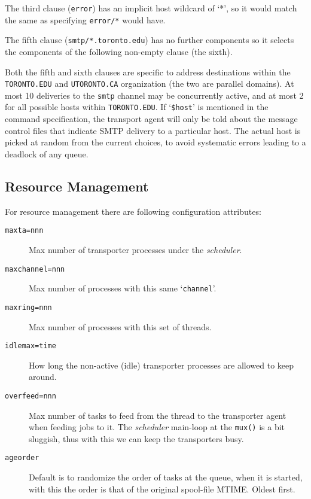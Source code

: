 The third clause ({\tt error}) has an implicit host wildcard of `*', 
so it would match the same as specifying {\tt error/*} would have.

The fifth clause ({\tt smtp/*.toronto.edu}) has no further components 
so it selects the components of the following non-empty clause (the sixth).

Both the fifth and sixth clauses are specific to address destinations
within the {\tt TORONTO.EDU} and {\tt UTORONTO.CA} organization (the 
two are parallel domains). At most 10 deliveries to the {\tt smtp} channel
may be concurrently active, and at most 2 for all possible hosts within
{\tt TORONTO.EDU}. If `{\tt \$host}' is mentioned in the command 
specification, the transport agent will only be told about the message 
control files that indicate SMTP delivery to a particular host. The actual 
host is picked at random from the current choices, to avoid systematic
errors leading to a deadlock of any queue. 






\subsection{Resource Management}



For resource management there are following configuration attributes: 

\begin{description}
\item[{\tt maxta=nnn}] \mbox{}

Max number of transporter processes under 
the {\em scheduler\/}. 

\item[{\tt maxchannel=nnn}] \mbox{}

Max number of processes with this same 
`{\tt channel}'. 

\item[{\tt maxring=nnn}] \mbox{}

Max number of processes with this set of 
threads. 

\item[{\tt idlemax=time}] \mbox{}

How long the non-active (idle) transporter 
processes are allowed to keep around. 

\item[{\tt overfeed=nnn}] \mbox{}

Max number of tasks to feed from the 
thread to the transporter agent when feeding jobs to it. The 
{\em scheduler\/} main-loop at the {\tt mux()} is a bit sluggish, 
thus with this we can keep the transporters busy. 

\item[{\tt ageorder}] \mbox{}

Default is to randomize the order of tasks 
at the queue, when it is started, with this the order is that of 
the original spool-file MTIME. Oldest first. 

\end{description}







